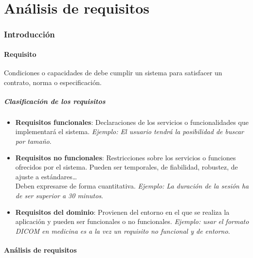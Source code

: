 \part{Análisis de requisitos}
\section{Introducción}

\subsection{Requisito}
Condiciones o capacidades de debe cumplir un sistema para satisfacer un contrato, norma o especificación.

\subsubsection{Clasificación de los requisitos}
\begin{itemize} %
    \item \textbf{Requisitos funcionales}: Declaraciones de los servicios o funcionalidades que implementará el sistema. \textit{Ejemplo: El usuario tendrá la posibilidad de buscar por tamaño}.

    \item \textbf{Requisitos no funcionales}: Restricciones sobre los servicios o funciones ofrecidos por el sistema. Pueden ser temporales, de fiabilidad, robustez, de ajuste a estándares\ldots\\
          Deben expresarse de forma cuantitativa.
          \textit{Ejemplo: La duración de la sesión ha de ser superior a 30 minutos}.

    \item \textbf{Requisitos del dominio}: Provienen del entorno en el que se realiza la aplicación y pueden ser funcionales o no funcionales. \textit{Ejemplo: usar el formato DICOM en medicina es a la vez un requisito no funcional y de entorno}.
\end{itemize}

\subsection{Análisis de requisitos}

